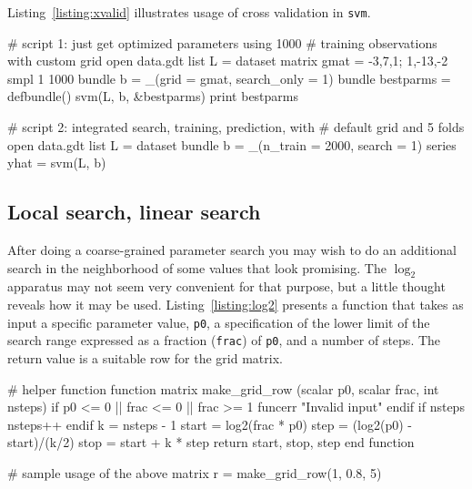 \documentclass{article}
\begin{document}
Listing~\ref{listing:xvalid} illustrates usage of cross validation in
\texttt{svm}.

\begin{script}[htbp]
  \caption{Grid search with cross validation}
  \label{listing:xvalid}
\begin{scode}
# script 1: just get optimized parameters using 1000
# training observations with custom grid
open data.gdt
list L = dataset
matrix gmat = {-3,7,1; 1,-13,-2}
smpl 1 1000
bundle b = _(grid = gmat, search_only = 1)
bundle bestparms = defbundle()
svm(L, b, &bestparms)
print bestparms

# script 2: integrated search, training, prediction, with
# default grid and 5 folds
open data.gdt
list L = dataset
bundle b = _(n_train = 2000, search = 1)
series yhat = svm(L, b)
\end{scode}
\end{script}

\subsection{Local search, linear search}
\label{sec:local-search}

After doing a coarse-grained parameter search you may wish to do an
additional search in the neighborhood of some values that look
promising.  The $\log_2$ apparatus may not seem very convenient for
that purpose, but a little thought reveals how it may be
used. Listing~\ref{listing:log2} presents a function that takes as
input a specific parameter value, \texttt{p0}, a specification of the
lower limit of the search range expressed as a fraction
(\texttt{frac}) of \texttt{p0}, and a number of steps. The return
value is a suitable row for the grid matrix.

\begin{script}[htbp]
  \caption{Determining a local search specification}
  \label{listing:log2}
\begin{scode}
# helper function
function matrix make_grid_row (scalar p0, scalar frac, int nsteps)
  if p0 <= 0 || frac <= 0 || frac >= 1
    funcerr "Invalid input"
  endif
  if nsteps %
    nsteps++
  endif
  k = nsteps - 1
  start = log2(frac * p0)
  step = (log2(p0) - start)/(k/2)
  stop = start + k * step
  return {start, stop, step}
end function

# sample usage of the above
matrix r = make_grid_row(1, 0.8, 5)
\end{scode}
\end{script}
\end{document}

